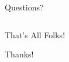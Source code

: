 \documentclass[aspectratio=169]{beamer}
\begin{document}
\begin{frame}{Questions?}
\begin{columns}
\begin{column}[c]{0.5\textwidth}
        \end{column}
    \end{columns}
\end{frame}

\begin{frame}{That's All Folks!}
    \begin{center}
        \huge{Thanks!}
    \end{center}
\end{frame}
\end{document}
